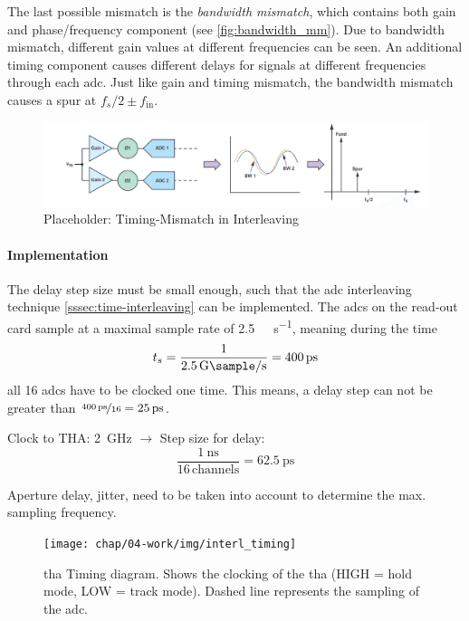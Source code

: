The last possible mismatch is the \textit{bandwidth mismatch}, which contains both gain and phase/frequency component (see \autoref{fig:bandwidth_mm}). 
Due to bandwidth mismatch, different gain values at different frequencies can be seen. 
An additional timing component causes different delays for signals at different frequencies through each \gls{adc}. 
Just like gain and timing mismatch, the bandwidth mismatch causes a spur at $f_s/2 \pm f_{\text{in}}$.
\begin{figure}[tbh]
	\centering
	\includegraphics[width = \textwidth]{chap/02-theory/img/bandwidth_mm}
	\caption{Placeholder: Timing-Mismatch in Interleaving \cite{Harris2019}}
	\label{fig:bandwidth_mm}
\end{figure}

\paragraph{Implementation}\label{ssec:interl_impl}
The delay step size must be small enough, such that the \gls{adc} interleaving technique \autoref{sssec:time-interleaving} can be implemented.
The \glspl{adc} on the read-out card sample at a maximal sample rate of \SI{2.5}{\giga \sample \per \second}, meaning during the time
\begin{equation}
	t_s = \frac{1}{\SI{2.5}{\giga \sample \per \second}} = \SI{400}{\pico \second}
\end{equation}
all 16 \glspl{adc} have to be clocked one time.
This means, a delay step can not be greater than $\nicefrac{\SI{400}{\pico\second}}{16} = \SI{25}{\pico\second}$.

Clock to THA: \SI{2}{\GHz}
$\rightarrow$ Step size for delay:
\begin{equation}
	\frac{\SI{1}{\nano \second}}{16 \, \text{channels}} = \SI{62.5}{\pico \second}
\end{equation}

Aperture delay, jitter, need to be taken into account to determine the max. sampling frequency.

\begin{figure}
	\centering
	\tikzexternaldisable
	\texttt{[image: chap/04-work/img/interl\_timing]}
	\tikzexternalenable
	\caption[Track-And-Hold Timing diagram]{\gls{tha} Timing diagram. Shows the clocking of the \gls{tha} (HIGH = hold mode, LOW = track mode). Dashed line represents the sampling of the \gls{adc}.}
	\label{fig:THA}
\end{figure}


